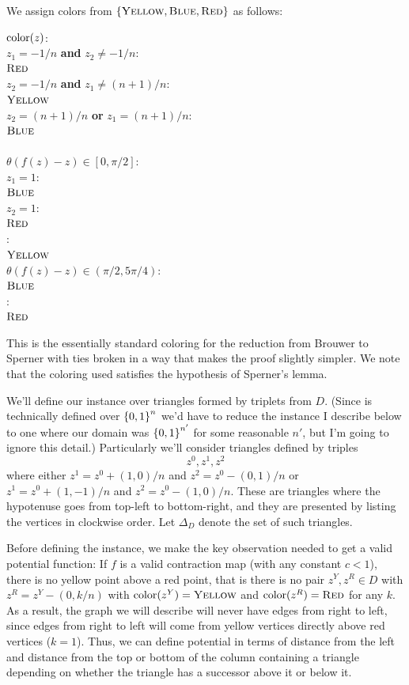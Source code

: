 We assign colors from $\left\{ \textsc{Yellow}, \textsc{Blue}, \textsc{Red} \right\}$ as follows:
  \begin{algo}
    $\operatorname{color}(z)$:\+
    \\ \IfB $z_1 = -1/n$ \textbf{and} $z_2 \neq -1/n$:\+
    \\   \ReturnB $\textsc{Red}$\-
    \\ \ElseIfB $z_2 = -1/n$ \textbf{and} $z_1 \neq (n+1)/n$:\+
    \\   \ReturnB $\textsc{Yellow}$\-
    \\ \ElseIfB $z_2 = (n+1)/n$ \textbf{or} $z_1 = (n+1)/n$:\+
    \\   \ReturnB $\textsc{Blue}$\-
    \\
    \\ \IfB $\theta(f(z) - z) \in [0, \pi/2]$:\+
    \\   \IfB $z_1 = 1$:\+
    \\     \ReturnB $\textsc{Blue}$\-
    \\   \ElseIfB $z_2 = 1$:\+
    \\     \ReturnB $\textsc{Red}$\-
    \\   \ElseB:\+
    \\     \ReturnB $\textsc{Yellow}$\-\-
    \\ \ElseIfB $\theta(f(z) - z) \in (\pi/2, 5\pi/4)$:\+
    \\   \ReturnB $\textsc{Blue}$\-
    \\ \ElseIfB:\+
    \\   \ReturnB $\textsc{Red}$\-\-
  \end{algo}

  This is the essentially standard coloring for the reduction from Brouwer to Sperner with ties broken in a way that makes the proof slightly simpler. We note that the coloring used satisfies the hypothesis of Sperner's lemma.

  We'll define our \EOPL instance over triangles formed by triplets from $D$. (Since \EOPL is technically defined over $\left\{ 0,1 \right\}^n$ we'd have to reduce the instance I describe below to one where our domain was $\left\{ 0,1 \right\}^{n'}$ for some reasonable $n'$, but I'm going to ignore this detail.) Particularly we'll consider triangles defined by triples
  \[z^0,z^1,z^2\] where either $z^1 = z^0 + (1,0)/n$ and $z^2 = z^0 - (0, 1)/n$ or $z^1 = z^0 + (1,-1)/n$ and $z^2 = z^0 - (1,0)/n$. These are triangles where the hypotenuse goes from top-left to bottom-right, and they are presented by listing the vertices in clockwise order. Let $\Delta_D$ denote the set of such triangles. 

  Before defining the \EOPL instance, we make the key observation needed to get a valid potential function: If $f$ is a valid contraction map (with any constant $c < 1$), there is no yellow point above a red point, that is there is no pair $z^Y,z^R \in D$ with $z^R = z^Y - (0,k/n)$ with $\operatorname{color}(z^Y) = \textsc{Yellow}$ and $\operatorname{color}(z^R) = \textsc{Red}$ for any $k$. As a result, the graph we will describe will never have edges from right to left, since edges from right to left will come from yellow vertices directly above red vertices ($k=1$). Thus, we can define potential in terms of distance from the left and distance from the top or bottom of the column containing a triangle depending on whether the triangle has a successor above it or below it.

